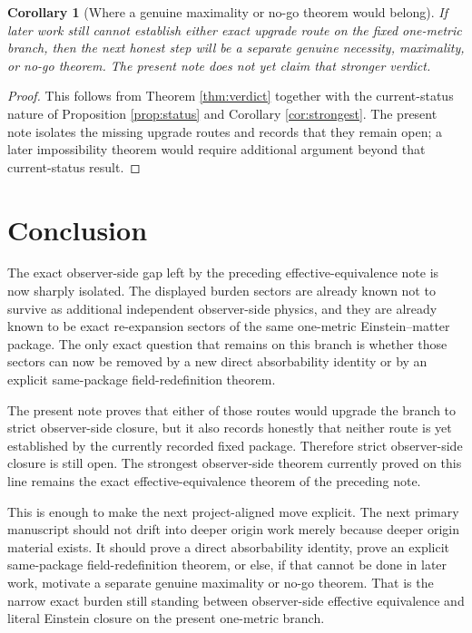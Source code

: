 \documentclass[11pt]{article}
\newtheorem{corollary}{Corollary}
\begin{document}
\begin{corollary}[Where a genuine maximality or no-go theorem would belong]
\label{cor:max}
If later work still cannot establish either exact upgrade route on the fixed one-metric branch, then the next honest step will be a separate genuine necessity, maximality, or no-go theorem. The present note does not yet claim that stronger verdict.
\end{corollary}

\begin{proof}
This follows from Theorem \ref{thm:verdict} together with the current-status nature of Proposition \ref{prop:status} and Corollary \ref{cor:strongest}. The present note isolates the missing upgrade routes and records that they remain open; a later impossibility theorem would require additional argument beyond that current-status result.
\end{proof}

\section{Conclusion}

The exact observer-side gap left by the preceding effective-equivalence note is now sharply isolated. The displayed burden sectors are already known not to survive as additional independent observer-side physics, and they are already known to be exact re-expansion sectors of the same one-metric Einstein--matter package. The only exact question that remains on this branch is whether those sectors can now be removed by a new direct absorbability identity or by an explicit same-package field-redefinition theorem.

The present note proves that either of those routes would upgrade the branch to strict observer-side closure, but it also records honestly that neither route is yet established by the currently recorded fixed package. Therefore strict observer-side closure is still open. The strongest observer-side theorem currently proved on this line remains the exact effective-equivalence theorem of the preceding note.

This is enough to make the next project-aligned move explicit. The next primary manuscript should not drift into deeper origin work merely because deeper origin material exists. It should prove a direct absorbability identity, prove an explicit same-package field-redefinition theorem, or else, if that cannot be done in later work, motivate a separate genuine maximality or no-go theorem. That is the narrow exact burden still standing between observer-side effective equivalence and literal Einstein closure on the present one-metric branch.
\end{document}
